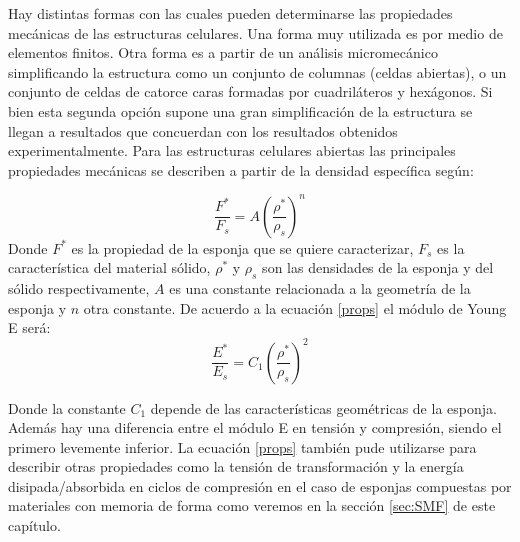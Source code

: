 \documentclass[a4paper,12pt,fleqn,twoside,openany]{book}
\begin{document}
Hay distintas formas con las cuales pueden determinarse las propiedades mecánicas de las estructuras celulares. Una forma muy utilizada es por medio 
de elementos finitos. Otra forma
es a partir de un análisis micromecánico simplificando la estructura como un conjunto de columnas (celdas abiertas), o un conjunto de celdas de catorce caras formadas por cuadriláteros y hexágonos. Si bien esta segunda opción supone una gran simplificación de la estructura se llegan a resultados que concuerdan con los 
resultados obtenidos experimentalmente. Para las estructuras celulares abiertas las principales propiedades mecánicas se describen a partir de la densidad específica \cite{duering} según:

\begin{equation}
\frac{F^*}{F_s}=A \left(\frac{\rho^*}{\rho_s}\right)^n \label{props} 
\end{equation}
Donde $F^*$ es la propiedad de la esponja que se quiere caracterizar, $F_s$ es la característica del material sólido, $\rho^*$ y $\rho_s$ son las 
densidades de la esponja y del sólido respectivamente, $A$ es una constante relacionada a la geometría de la esponja y $n$ otra constante. De acuerdo 
a la ecuación \ref{props} el módulo de Young E \cite{duering} será:
\begin{equation}
\frac{E^*}{E_s}=C_1 \left(\frac{\rho^*}{\rho_s}\right)^2 \label{propsE}  
\end{equation}

Donde la constante $C_1$ depende de las características geométricas de la esponja. 
Además hay una diferencia entre el módulo E en tensión y compresión, siendo el primero levemente inferior. La ecuación \ref{props} también pude utilizarse 
para describir otras propiedades como la tensión de transformación y la energía disipada/absorbida en ciclos de compresión en el caso de esponjas 
compuestas por materiales con memoria de forma como veremos en la sección \ref{sec:SMF} de este capítulo. 
\end{document}
